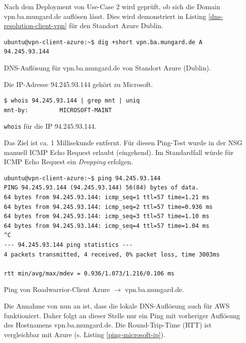 Nach dem \gls{Deployment} von Use-Case 2 wird geprüft, ob sich die Domain vpn.ba.mungard.de auflösen lässt. Dies wird demonstriert in Listing \ref{dns-resolution-client-vpn} für den Standort Azure Dublin.
\begin{listing}[h]
\begin{verbatim}
ubuntu@vpn-client-azure:~$ dig +short vpn.ba.mungard.de A
94.245.93.144

\end{verbatim}
\caption{DNS-Auflösung für vpn.ba.mungard.de von Standort Azure (Dublin).}
\label{dns-resolution-client-vpn}
\end{listing}\FloatBarrier
Die IP-Adresse 94.245.93.144 gehört zu Microsoft.
\begin{listing}[h]
\begin{verbatim}
$ whois 94.245.93.144 | grep mnt | uniq
mnt-by:         MICROSOFT-MAINT

\end{verbatim}
\caption{\texttt{whois} für die IP 94.245.93.144.}
\label{whois-microsoft-ip}
\end{listing}\FloatBarrier
Das Ziel ist ca. 1 Millisekunde entfernt. Für diesen Ping-Test wurde in der \gls{NSG} manuell \gls{ICMP} Echo Request erlaubt (eingehend). Im Standardfall würde für \gls{ICMP} Echo Request ein \textit{Dropping} erfolgen.
\begin{listing}[h]
\begin{verbatim}
ubuntu@vpn-client-azure:~$ ping 94.245.93.144
PING 94.245.93.144 (94.245.93.144) 56(84) bytes of data.
64 bytes from 94.245.93.144: icmp_seq=1 ttl=57 time=1.21 ms
64 bytes from 94.245.93.144: icmp_seq=2 ttl=57 time=0.936 ms
64 bytes from 94.245.93.144: icmp_seq=3 ttl=57 time=1.10 ms
64 bytes from 94.245.93.144: icmp_seq=4 ttl=57 time=1.04 ms
^C
--- 94.245.93.144 ping statistics ---
4 packets transmitted, 4 received, 0% packet loss, time 3003ms

rtt min/avg/max/mdev = 0.936/1.073/1.216/0.106 ms

\end{verbatim}
\caption{Ping von Roadwarrior-Client Azure $\rightarrow$ vpn.ba.mungard.de.}
\label{ping-microsoft-ip}
\end{listing}\FloatBarrier
Die Annahme von nun an ist, dass die lokale \gls{DNS}-Auflösung auch für AWS funktioniert. Daher folgt an dieser Stelle nur ein Ping mit vorheriger Auflösung des Hostnamens vpn.ba.mungard.de. Die Round-Trip-Time (RTT) ist vergleichbar mit Azure (s. Listing \ref{ping-microsoft-ip}).

